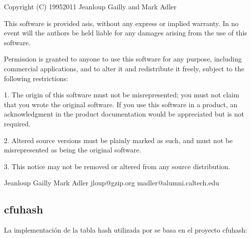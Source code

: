 \documentclass[a4,10pt,spanish]{sphinxmanual}
\begin{document}
\begin{sphinxVerbatim}[commandchars=\\\{\}]
Copyright (C) 1995\PYGZhy{}2011 Jean\PYGZhy{}loup Gailly and Mark Adler

This software is provided \PYGZsq{}as\PYGZhy{}is\PYGZsq{}, without any express or implied
warranty.  In no event will the authors be held liable for any damages
arising from the use of this software.

Permission is granted to anyone to use this software for any purpose,
including commercial applications, and to alter it and redistribute it
freely, subject to the following restrictions:

1. The origin of this software must not be misrepresented; you must not
   claim that you wrote the original software. If you use this software
   in a product, an acknowledgment in the product documentation would be
   appreciated but is not required.

2. Altered source versions must be plainly marked as such, and must not be
   misrepresented as being the original software.

3. This notice may not be removed or altered from any source distribution.

Jean\PYGZhy{}loup Gailly        Mark Adler
jloup@gzip.org          madler@alumni.caltech.edu
\end{sphinxVerbatim}


\subsection{cfuhash}
\label{\detokenize{license:cfuhash}}
\sphinxAtStartPar
La implementación de la tabla hash utilizada por  se basa en el proyecto cfuhash:
\end{document}
